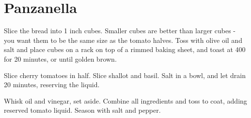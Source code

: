 \section{Panzanella}
\begin{recipe}



Slice the bread into 1 inch cubes. Smaller cubes are better than larger cubes - you
want them to be the same size as the tomato halves. Toss with olive oil and salt and place
cubes on a rack on top of a rimmed baking sheet, and toast at 400\degree{} for
20 minutes, or until golden brown.


Slice cherry tomatoes in half. Slice shallot and basil. Salt in a bowl,
and let drain 20 minutes, reserving the liquid.


Whisk oil and vinegar, set aside. Combine all ingredients and toss to coat,
adding reserved tomato liquid. Season with salt and pepper.

\end{recipe}
